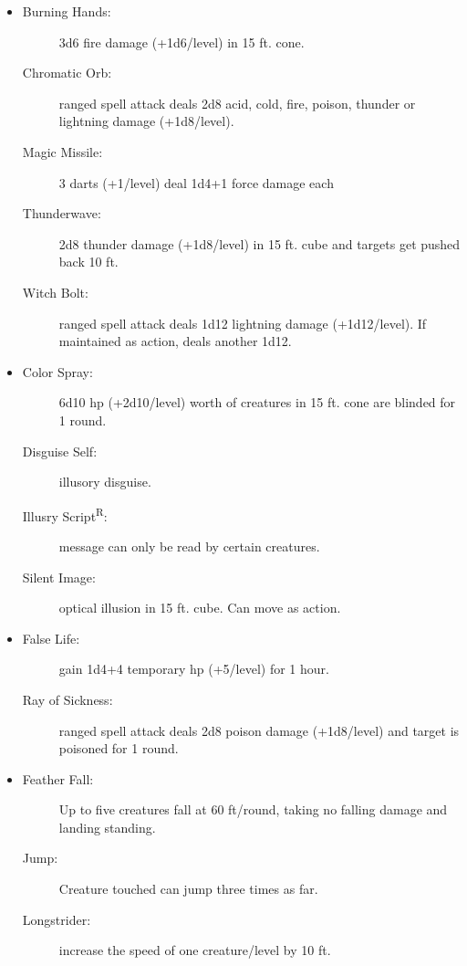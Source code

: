 \documentclass[DIV=14, paper=a4, fontsize=12pt, twocolumn, twoside]{scrartcl}
\begin{document}
\begin{itemize}[align=parleft,labelwidth=1cm]
\begin{description}
	\end{description}
	\renewcommand{\labelitemi}{Evoc}\item
	\begin{description}
\item[Burning Hands:] 3d6 fire damage (+1d6/level) in 15 ft. cone.
\item[Chromatic Orb:] ranged spell attack deals 2d8 acid, cold, fire, poison, thunder or lightning damage (+1d8/level).
\item[Magic Missile:] 3 darts (+1/level) deal 1d4+1 force damage each
\item[Thunderwave:] 2d8 thunder damage (+1d8/level) in 15 ft. cube and targets get pushed back 10 ft.
\item[Witch Bolt:] ranged spell attack deals 1d12 lightning damage (+1d12/level). If maintained as action, deals another 1d12.
	\end{description}
	\renewcommand{\labelitemi}{Illus}\item
	\begin{description}
\item[Color Spray:] 6d10 hp (+2d10/level) worth of creatures in 15 ft.
cone are blinded for 1 round.
\item[Disguise Self:] illusory disguise.
\item[Illusry Script\textsuperscript{R}:] message can only be read by certain creatures.
\item[Silent Image:] optical illusion in 15 ft. cube. Can move as action.	
	\end{description}
	\renewcommand{\labelitemi}{Necro}\item
	\begin{description}
\item[False Life:] gain 1d4+4 temporary hp (+5/level) for 1 hour.
\item[Ray of Sickness:] ranged spell attack deals 2d8 poison damage (+1d8/level) and target is poisoned for 1 round.
	\end{description}
	\renewcommand{\labelitemi}{Trans}\item
	\begin{description}
\item[Feather Fall:] Up to five creatures fall at 60 ft/round, taking no falling damage and landing standing.
\item[Jump:] Creature touched can jump three times as far.
\item[Longstrider:] increase the speed of one creature/level by 10 ft.
	\end{description}
\end{itemize}
\end{document}
